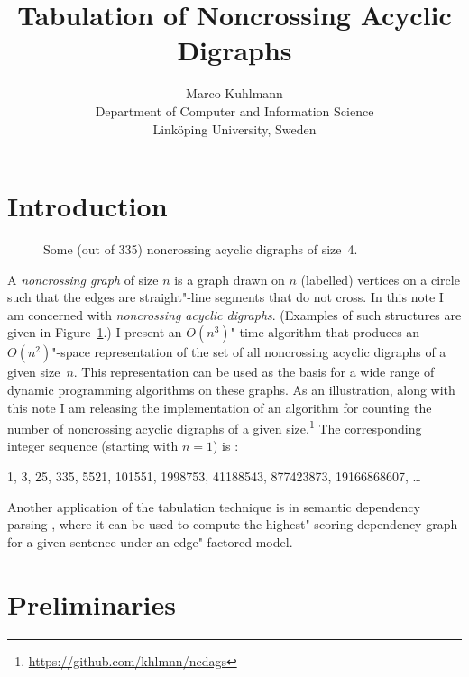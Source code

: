 \documentclass[a4paper]{article}
\begin{document}
\title{Tabulation of Noncrossing Acyclic Digraphs}

\author{%
	Marco Kuhlmann\\
	Department of Computer and Information Science\\
	Linköping University, Sweden}

\maketitle


\section{Introduction}

\begin{figure}
	\centering\footnotesize
	
	\caption{Some (out of 335) noncrossing acyclic digraphs of size~4.}
	\label{fig:ncdags-examples}
\end{figure}

A \emph{noncrossing graph} of size $n$ is a graph drawn on $n$ (labelled) vertices on a circle such that the edges are straight"-line segments that do not cross.
In this note I am concerned with \emph{noncrossing acyclic digraphs}.
(Examples of such structures are given in Figure~\ref{fig:ncdags-examples}.)
I present an $O(n^3)$"-time algorithm that produces an $O(n^2)$"-space representation of the set of all noncrossing acyclic digraphs of a given size~$n$.
This representation can be used as the basis for a wide range of dynamic programming algorithms on these graphs.
As an illustration, along with this note I am releasing the implementation of an algorithm for counting the number of noncrossing acyclic digraphs of a given size.\footnote{\url{https://github.com/khlmnn/ncdags}}
The corresponding integer sequence (starting with $n = 1$) is \citep{tirrell2014number}:
\begin{center}
	1, 3, 25, 335, 5521, 101551, 1998753, 41188543, 877423873, 19166868607, \dots
\end{center}
Another application of the tabulation technique is in semantic dependency parsing \citep{oepen2014broad}, where it can be used to compute the highest"-scoring dependency graph for a given sentence under an edge"-factored model.


\section{Preliminaries}
\end{document}
